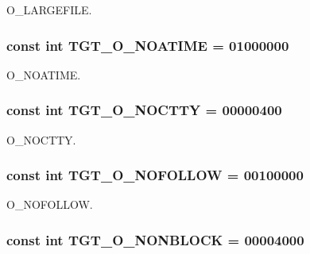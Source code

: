 O\_\-LARGEFILE. \hypertarget{classPowerLinux_a0ee8b0c23c2babc48e978e872b03c82c}{
\subsubsection[{TGT\_\-O\_\-NOATIME}]{\setlength{\rightskip}{0pt plus 5cm}const int {\bf TGT\_\-O\_\-NOATIME} = 01000000}}
\label{classPowerLinux_a0ee8b0c23c2babc48e978e872b03c82c}


O\_\-NOATIME. \hypertarget{classPowerLinux_adfd4240281579e5f60c5e22c601225d8}{
\subsubsection[{TGT\_\-O\_\-NOCTTY}]{\setlength{\rightskip}{0pt plus 5cm}const int {\bf TGT\_\-O\_\-NOCTTY} = 00000400}}
\label{classPowerLinux_adfd4240281579e5f60c5e22c601225d8}


O\_\-NOCTTY. \hypertarget{classPowerLinux_a9c27f68ab31ddfdd3e35800ea1f02a89}{
\subsubsection[{TGT\_\-O\_\-NOFOLLOW}]{\setlength{\rightskip}{0pt plus 5cm}const int {\bf TGT\_\-O\_\-NOFOLLOW} = 00100000}}
\label{classPowerLinux_a9c27f68ab31ddfdd3e35800ea1f02a89}


O\_\-NOFOLLOW. \hypertarget{classPowerLinux_a0ea5420b4c9b45ba342a266fb77ac942}{
\subsubsection[{TGT\_\-O\_\-NONBLOCK}]{\setlength{\rightskip}{0pt plus 5cm}const int {\bf TGT\_\-O\_\-NONBLOCK} = 00004000}}
\label{classPowerLinux_a0ea5420b4c9b45ba342a266fb77ac942}


